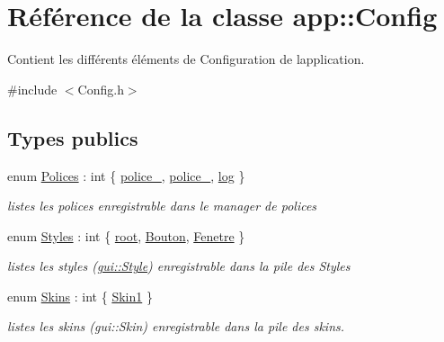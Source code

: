 \hypertarget{classapp_1_1_config}{}\section{Référence de la classe app\+:\+:Config}
\label{classapp_1_1_config}


Contient les différents éléments de Configuration de l\textquotesingle{}application.  




{\ttfamily \#include $<$Config.\+h$>$}

\subsection*{Types publics}
\begin{DoxyCompactItemize}
\item 
enum \hyperlink{classapp_1_1_config_ac576a323feff0b9aaa6aecd40e038049}{Polices} \+: int \{ \hyperlink{classapp_1_1_config_ac576a323feff0b9aaa6aecd40e038049a759ba1bca9923fc3b3e61b9e0edd154a}{police\+\_}, 
\hyperlink{classapp_1_1_config_ac576a323feff0b9aaa6aecd40e038049abd01fcbe87968783a525da9dc5ef0f21}{police\+\_}, 
\hyperlink{classapp_1_1_config_ac576a323feff0b9aaa6aecd40e038049aa9e5b356892159d1526d850436f9186e}{log}
 \}\begin{DoxyCompactList}\small\item\em listes les polices enregistrable dans le manager de polices \end{DoxyCompactList}
\item 
enum \hyperlink{classapp_1_1_config_ab0fd2b7fe87a4b68c93d2a4a7209beda}{Styles} \+: int \{ \hyperlink{classapp_1_1_config_ab0fd2b7fe87a4b68c93d2a4a7209bedaa02fd230360f0a9b4e42a24c2e826e2a7}{root}, 
\hyperlink{classapp_1_1_config_ab0fd2b7fe87a4b68c93d2a4a7209bedaa853b0170848ebe1bb8aa66895283a816}{Bouton}, 
\hyperlink{classapp_1_1_config_ab0fd2b7fe87a4b68c93d2a4a7209bedaa1297561847b1b84d487c3a875f5f8f6a}{Fenetre}
 \}\begin{DoxyCompactList}\small\item\em listes les styles (\hyperlink{classgui_1_1_style}{gui\+::\+Style}) enregistrable dans la pile des Styles \end{DoxyCompactList}
\item 
enum \hyperlink{classapp_1_1_config_a457412fb51e1853408f2201a69471e32}{Skins} \+: int \{ \hyperlink{classapp_1_1_config_a457412fb51e1853408f2201a69471e32abb0a28eb4da75e2aadaf74b6d9aa2d4e}{Skin1}
 \}\begin{DoxyCompactList}\small\item\em listes les skins (gui\+::\+Skin) enregistrable dans la pile des skins. \end{DoxyCompactList}
\end{DoxyCompactItemize}

